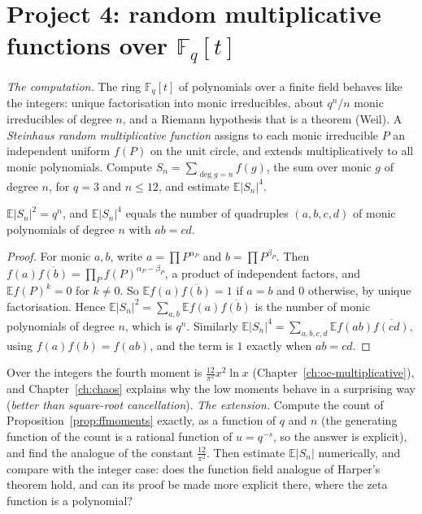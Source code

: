 \section{Project 4: random multiplicative functions over $\mathbb F_q[t]$}

\emph{The computation.} The ring $\mathbb F_q[t]$ of polynomials over a finite field behaves like the integers: unique factorisation into monic irreducibles, about $q^n/n$ monic irreducibles of degree $n$, and a Riemann hypothesis that is a theorem (Weil). A \emph{Steinhaus random multiplicative function} assigns to each monic irreducible $P$ an independent uniform $f(P)$ on the unit circle, and extends multiplicatively to all monic polynomials. Compute $S_n=\sum_{\deg g=n}f(g)$, the sum over monic $g$ of degree $n$, for $q=3$ and $n\le12$, and estimate $\mathbb E|S_n|^4$.

\begin{proposition}\label{prop:ffmoments}
$\mathbb E|S_n|^2=q^n$, and $\mathbb E|S_n|^4$ equals the number of quadruples $(a,b,c,d)$ of monic polynomials of degree $n$ with $ab=cd$.
\end{proposition}

\begin{proof}
For monic $a,b$, write $a=\prod P^{\alpha_P}$ and $b=\prod P^{\beta_P}$. Then $f(a)\overline{f(b)}=\prod_Pf(P)^{\alpha_P-\beta_P}$, a product of independent factors, and $\mathbb E f(P)^k=0$ for $k\ne0$. So $\mathbb E f(a)\overline{f(b)}=1$ if $a=b$ and $0$ otherwise, by unique factorisation. Hence $\mathbb E|S_n|^2=\sum_{a,b}\mathbb E f(a)\overline{f(b)}$ is the number of monic polynomials of degree $n$, which is $q^n$. Similarly $\mathbb E|S_n|^4=\sum_{a,b,c,d}\mathbb E f(ab)\overline{f(cd)}$, using $f(a)f(b)=f(ab)$, and the term is $1$ exactly when $ab=cd$.
\end{proof}

Over the integers the fourth moment is $\frac{12}{\pi^2}x^2\ln x$ (Chapter~\ref{ch:oc-multiplicative}), and Chapter~\ref{ch:chaos} explains why the low moments behave in a surprising way (\emph{better than square-root cancellation}). \emph{The extension.} Compute the count of Proposition~\ref{prop:ffmoments} exactly, as a function of $q$ and $n$ (the generating function of the count is a rational function of $u=q^{-s}$, so the answer is explicit), and find the analogue of the constant $\frac{12}{\pi^2}$. Then estimate $\mathbb E|S_n|$ numerically, and compare with the integer case: does the function field analogue of Harper's theorem hold, and can its proof be made more explicit there, where the zeta function is a polynomial?

